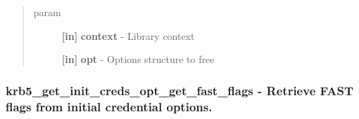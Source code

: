 \documentclass[letterpaper,10pt,english]{sphinxmanual}
\begin{document}
\begin{fulllineitems}
\label{appdev/refs/api/krb5_get_init_creds_opt_free:krb5_get_init_creds_opt_free}
\end{fulllineitems}

\begin{quote}\begin{description}
\item[{param}] \leavevmode
\textbf{{[}in{]}} \textbf{context} - Library context

\textbf{{[}in{]}} \textbf{opt} - Options structure to free

\end{description}\end{quote}




{\hyperref[appdev/refs/api/krb5_get_init_creds_opt_alloc:krb5_get_init_creds_opt_alloc]{}}




\subsubsection{krb5\_get\_init\_creds\_opt\_get\_fast\_flags -  Retrieve FAST flags from initial credential options.}
\label{appdev/refs/api/krb5_get_init_creds_opt_get_fast_flags::doc}\label{appdev/refs/api/krb5_get_init_creds_opt_get_fast_flags:krb5-get-init-creds-opt-get-fast-flags-retrieve-fast-flags-from-initial-credential-options}

\begin{fulllineitems}
\label{appdev/refs/api/krb5_get_init_creds_opt_get_fast_flags:krb5_get_init_creds_opt_get_fast_flags}
\end{fulllineitems}
\end{document}
